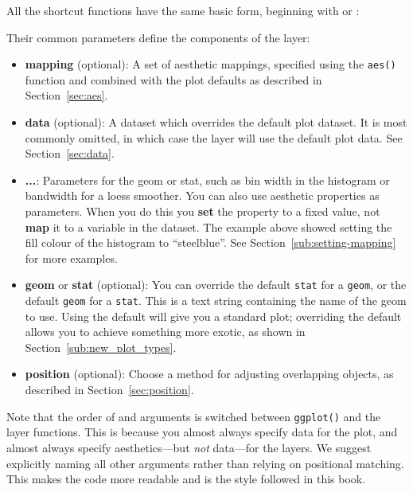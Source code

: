 \noindent All the shortcut functions have the same basic form, beginning with  or :

% 

\noindent Their common parameters define the components of the layer:

\begin{itemize}
  \item {\bf mapping} (optional): A set of aesthetic mappings, specified using the {\tt aes()} function and combined with the plot defaults as described in Section~\ref{sec:aes}.

  \item {\bf data} (optional): A dataset which overrides the default plot dataset.  It is most commonly omitted, in which case the layer will use the default plot data. See Section~\ref{sec:data}.
  
  \item {\bf ...}: Parameters for the geom or stat, such as bin width in the histogram or bandwidth for a loess smoother.  You can also use aesthetic properties as parameters.  When you do this you \textbf{set} the property to a fixed value,  not \textbf{map} it to a variable in the dataset.  The example above showed setting the fill colour of the histogram to ``steelblue''. See Section~\ref{sub:setting-mapping} for more examples.
  
  \item {\bf geom} or {\bf stat} (optional):  You can override the default {\tt stat} for a {\tt geom}, or the default {\tt geom} for a {\tt stat}.  This is a text string containing the name of the geom to use.  Using the default will give you a standard plot; overriding the default allows you to achieve something more exotic, as shown in Section~\ref{sub:new_plot_types}.

  \item {\bf position} (optional): Choose a method for adjusting overlapping objects, as described in Section~\ref{sec:position}.
  
\end{itemize}

Note that the order of  and  arguments is switched between {\tt ggplot()} and the layer functions.  This is because you almost always specify data for the plot, and almost always specify aesthetics---but {\em not} data---for the layers.  We suggest explicitly naming all other arguments rather than relying on positional matching.  This makes the code more readable and is the style followed in this book.

